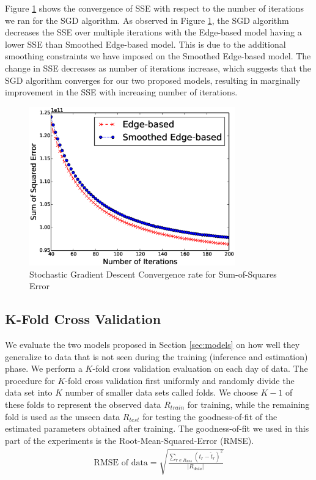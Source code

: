 \documentclass[conference]{IEEEtran.1.8}
\begin{document}
Figure \ref{fig:convergence} shows the convergence of SSE with respect to the number of iterations we ran for the SGD algorithm. %
As observed in Figure \ref{fig:convergence}, the SGD algorithm decreases the SSE over multiple iterations with the Edge-based model having a lower SSE than Smoothed Edge-based model. This is due to the additional smoothing constraints we have imposed on the Smoothed Edge-based model. The change in SSE decreases as number of iterations increase, which suggests that the SGD algorithm converges for our two proposed models, resulting in marginally improvement in the SSE with increasing number of iterations.
\begin{figure}[htb]
	\centering
	\includegraphics[width=3.5in]{convergence}
	\caption{Stochastic Gradient Descent Convergence rate for Sum-of-Squares Error}
	\label{fig:convergence}
\end{figure}

\subsection{K-Fold Cross Validation}

We evaluate the two models proposed in Section \ref{sec:models} on how well they generalize to data that is not seen during the training (inference and estimation) phase. We perform a $K$-fold cross validation evaluation on each day of data. The procedure for $K$-fold cross validation first uniformly and randomly divide the data set into $K$ number of smaller data sets called folds. We choose $K-1$ of these folds to represent the observed data $R_{train}$ for training, while the remaining fold is used as the unseen data $R_{test}$ for testing the goodness-of-fit of the estimated parameters obtained after training. The goodness-of-fit we used in this part of the experiments is the Root-Mean-Squared-Error (RMSE).
\begin{align*}
	\text{RMSE of data} = \sqrt{\frac{\sum_{r \in R_{data}} (t_r - \hat{t}_r)^2}{|R_{data}|}}
\end{align*}
\end{document}
